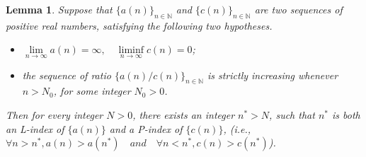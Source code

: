\documentclass[12pt,reqno]{amsart}
\renewcommand{\=}{\coloneqq}
\theoremstyle{plain}
\newtheorem{lemma}[theorem]{Lemma}
\begin{document}
\begin{lemma}\label{lem-3}
Suppose that $\{a(n)\}_{n\in\mathbb{N}}$ and $\{c(n)\}_{n\in\mathbb{N}}$ are two sequences of positive real numbers, satisfying the following two hypotheses.
\begin{itemize}
\item[(A).] $\lim\limits_{n\to\infty} a(n) = \infty, \quad \liminf\limits_{n\to\infty} c(n) = 0$;
\item[(B).] the sequence of ratio $\{a(n)/c(n)\}_{n\in\mathbb{N}}$ is strictly increasing whenever $n>N_0$, for some integer $N_{0}>0$.
\end{itemize}
Then for every integer $N>0$, there exists an integer $n^* >N$, such that $n^*$ is both an L-index of $\{a(n)\}$ and a P-index of $\{c(n)\}$, (i.e., $\forall n>n^*, a(n) > a (n^*) \quad and \quad \forall n<n^*, c(n) > c(n^*)$).
\end{lemma}
\end{document}
